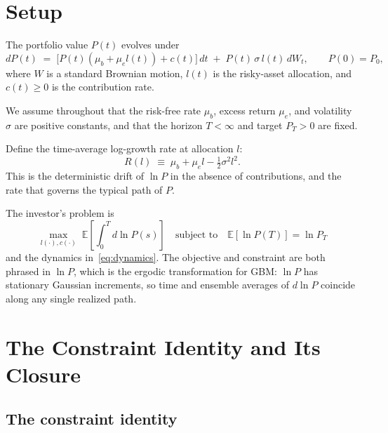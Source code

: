 \documentclass[11pt]{article}
\begin{document}
\section{Setup}
\label{sec:setup}

The portfolio value $P(t)$ evolves under
\begin{equation}
  \label{eq:dynamics}
  dP(t) \;=\; \bigl[P(t)(\mu_b + \mu_e l(t)) + c(t)\bigr]\,dt
  \;+\; P(t)\,\sigma\, l(t)\, dW_t,
  \qquad P(0) = P_0,
\end{equation}
where $W$ is a standard Brownian motion, $l(t)$ is the risky-asset
allocation, and $c(t) \geq 0$ is the contribution rate.

We assume throughout that the risk-free rate $\mu_b$, excess return
$\mu_e$, and volatility $\sigma$ are positive constants, and that the
horizon $T < \infty$ and target $P_T > 0$ are fixed.

Define the time-average log-growth rate at allocation $l$:
\begin{equation}
  \label{eq:R}
  R(l) \;\equiv\; \mu_b + \mu_e l - \tfrac12 \sigma^2 l^2.
\end{equation}
This is the deterministic drift of $\ln P$ in the absence of
contributions, and the rate that governs the typical path of $P$.

The investor's problem is
\begin{equation}
  \label{eq:problem}
  \max_{l(\cdot), c(\cdot)}\;
  \mathbb{E}\!\left[\int_0^T d\ln P(s)\right]
  \quad \text{subject to} \quad
  \mathbb{E}[\ln P(T)] = \ln P_T
\end{equation}
and the dynamics in~\eqref{eq:dynamics}. The objective and constraint
are both phrased in $\ln P$, which is the ergodic transformation for
GBM: $\ln P$ has stationary Gaussian increments, so time and ensemble
averages of $d\ln P$ coincide along any single realized path.

\section{The Constraint Identity and Its Closure}
\label{sec:identity}

\subsection{The constraint identity}
\end{document}
